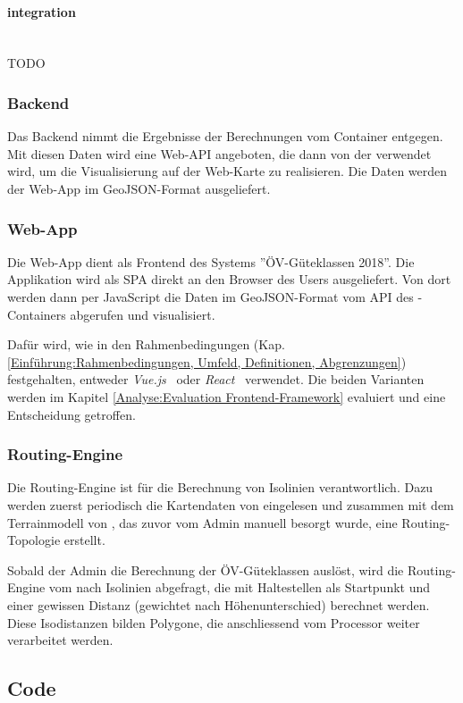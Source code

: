 \paragraph{integration}~\\
TODO

\subsubsection{Backend}
\label{container:Backend}

Das Backend nimmt die Ergebnisse der Berechnungen vom Container  entgegen.
Mit diesen Daten wird eine Web-\ac{API} angeboten, die dann von der  verwendet wird, um die Visualisierung auf der Web-Karte zu realisieren.
Die Daten werden der Web-App im \gls{GeoJSON}-Format ausgeliefert.


\subsubsection{Web-App}
\label{container:Web-App}

Die Web-App dient als Frontend des Systems ''\acs{ÖV}-Güteklassen 2018''.
Die Applikation wird als \ac{SPA} direkt an den Browser des Users ausgeliefert.
Von dort werden dann per JavaScript die Daten im \gls{GeoJSON}-Format vom \ac{API} des -Containers abgerufen und visualisiert.

Dafür wird, wie in den Rahmenbedingungen (Kap. \ref{Einführung:Rahmenbedingungen, Umfeld, Definitionen, Abgrenzungen}) festgehalten, entweder \emph{Vue.js}~\cite{vuejs} oder \emph{React}~\cite{react} verwendet.
Die beiden Varianten werden im Kapitel \ref{Analyse:Evaluation Frontend-Framework} evaluiert und eine Entscheidung getroffen.

\subsubsection{Routing-Engine}
\label{container:Routing-Engine}

Die Routing-Engine ist für die Berechnung von Isolinien verantwortlich.
Dazu werden zuerst periodisch die Kartendaten von  eingelesen und zusammen mit dem \gls{Terrainmodell} von , das zuvor vom Admin manuell besorgt wurde, eine Routing-Topologie erstellt.

Sobald der Admin die Berechnung der ÖV-Güteklassen auslöst, wird die Routing-Engine vom  nach Isolinien abgefragt, die mit Haltestellen als Startpunkt und einer gewissen Distanz (gewichtet nach Höhenunterschied) berechnet werden.
Diese Isodistanzen bilden Polygone, die anschliessend vom Processor weiter verarbeitet werden.


\subsection{Code}
\label{Architektur:Code}

